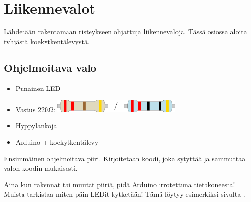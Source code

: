\chapter{Liikennevalot}

Lähdetään rakentamaan risteykseen ohjattuja liikennevaloja. Tässä osiossa aloita tyhjästä koekytkentälevystä.

\section{Ohjelmoitava valo}
\begin{minipage}{0.5\textwidth}
\begin{tcolorbox}[colback=lime!10,title=Tarvikkeet, colbacktitle=green!10,coltitle=black]
\begin{itemize}
    \item Punainen LED
    \item Vastus 220$\Omega$: \includegraphics[width=0.5\textwidth]{kuvat/220.pdf}
    \item Hyppylankoja
    \item Arduino + koekytkentälevy
\end{itemize}
\end{tcolorbox}
\end{minipage}
\begin{minipage}{0.5\textwidth}
\begin{tcolorbox}[colback=blue!10,title=Piirin toiminta,colbacktitle=purple!90]
Ensimmäinen ohjelmoitava piiri. Kirjoitetaan koodi, joka sytyttää ja sammuttaa valon koodin mukaisesti.
\tcblower
\begin{center}
\end{center}
\end{tcolorbox}
\end{minipage}

\begin{tcolorbox}[colback=red!10,colbacktitle=red,title=HUOM!]
Aina kun rakennat tai muutat piiriä, pidä Arduino irrotettuna tietokoneesta! 
\tcblower
Muista tarkistaa miten päin LEDit kytketään! Tämä löytyy esimerkiksi sivulta \pageref{box:led}.
\end{tcolorbox}

